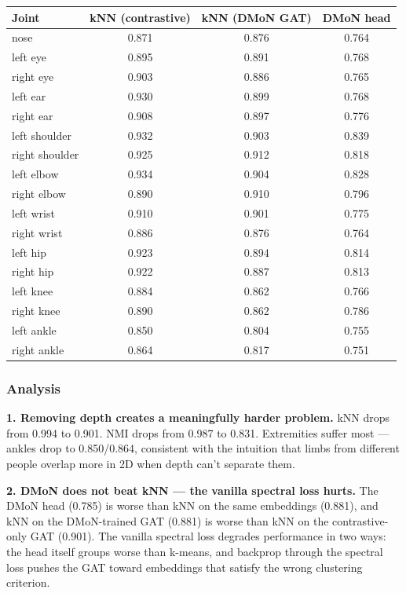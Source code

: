 \begin{center}
\small
\begin{tabular}{lccc}
\toprule
Joint & kNN (contrastive) & kNN (DMoN GAT) & DMoN head \\
\midrule
nose & 0.871 & 0.876 & 0.764 \\
left eye & 0.895 & 0.891 & 0.768 \\
right eye & 0.903 & 0.886 & 0.765 \\
left ear & 0.930 & 0.899 & 0.768 \\
right ear & 0.908 & 0.897 & 0.776 \\
left shoulder & 0.932 & 0.903 & 0.839 \\
right shoulder & 0.925 & 0.912 & 0.818 \\
left elbow & 0.934 & 0.904 & 0.828 \\
right elbow & 0.890 & 0.910 & 0.796 \\
left wrist & 0.910 & 0.901 & 0.775 \\
right wrist & 0.886 & 0.876 & 0.764 \\
left hip & 0.923 & 0.894 & 0.814 \\
right hip & 0.922 & 0.887 & 0.813 \\
left knee & 0.884 & 0.862 & 0.766 \\
right knee & 0.890 & 0.862 & 0.786 \\
left ankle & 0.850 & 0.804 & 0.755 \\
right ankle & 0.864 & 0.817 & 0.751 \\
\bottomrule
\end{tabular}
\end{center}


\subsubsection{Analysis}

\textbf{1. Removing depth creates a meaningfully harder problem.} kNN drops from 0.994 to 0.901. NMI drops from 0.987 to 0.831. Extremities suffer most --- ankles drop to 0.850/0.864, consistent with the intuition that limbs from different people overlap more in 2D when depth can't separate them.

\textbf{2. DMoN does not beat kNN --- the vanilla spectral loss hurts.} The DMoN head (0.785) is worse than kNN on the same embeddings (0.881), and kNN on the DMoN-trained GAT (0.881) is worse than kNN on the contrastive-only GAT (0.901). The vanilla spectral loss degrades performance in two ways: the head itself groups worse than k-means, and backprop through the spectral loss pushes the GAT toward embeddings that satisfy the wrong clustering criterion.

